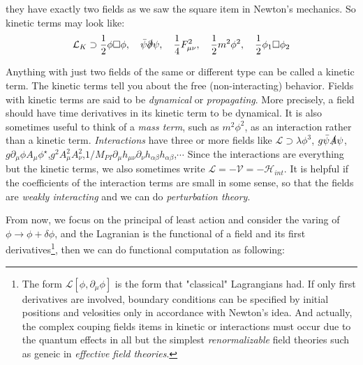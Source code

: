 \documentclass[12pt,openany]{book}
\begin{document}
	they have exactly two fields as we saw the square item in Newton's mechanics. So kinetic terms may look like:
	\begin{equation*}
		\mathcal{L}_K\supset\frac{1}{2}\phi\Box\phi,\quad \bar{\psi}\slashed{\partial}\psi,\quad\frac{1}{4}F^2_{\mu\nu},\quad \frac{1}{2}m^2\phi^2,\quad\frac{1}{2}\phi_1 \Box \phi_2
	\end{equation*}\par 
	Anything with just two fields of the same or different type can be called a kinetic term.
	The kinetic terms tell you about the free (non-interacting) behavior. Fields with kinetic terms are 
	said to be \textit{dynamical} or \textit{propagating}. More precisely, a field should have time derivatives
	in its kinetic term to be dynamical. It is also sometimes useful to think of a \textit{mass term}, such as $m^2\phi^2$,
	as an interaction rather than a kinetic term. \textit{Interactions} have three or more fields like $\mathcal{L}\supset\lambda\phi^3$,
	$g\bar{\psi}\slashed{A}\psi$,$g\partial_\mu\phi A_\mu\phi^\star$,$g^2A_\mu^2A_\nu^2$,$1/M_{PI}\partial_\mu h_{\mu\nu}\partial_\nu h_{\alpha\beta}h_{\alpha\beta}$,$\cdots$ Since
	the interactions are everything but the kinetic terms, we also sometimes write $\mathcal{L}=-\mathcal{V}=-\mathcal{H}_{int}$. It is 
	helpful if the coefficients of the interaction terms are small in some sense, so that the fields are \textit{weakly interacting} and 
	we can do \textit{perturbation theory}.\par
	From now, we focus on the principal of least action and consider the varing
	of $\phi\rightarrow\phi+\delta\phi$, and the Lagranian is the functional of a field and its first derivatives\footnote{
		The form $\mathcal{L}[\phi,\partial_\mu\phi]$ is the form that "classical" Lagrangians had. If only first derivatives are 
		involved, boundary conditions can be specified by initial positions and velosities only in accordance with Newton's idea. And 
		actually, the complex couping fields items in kinetic or interactions must occur due to the quantum effects in all but the simplest
		\textit{renormalizable} field theories such as geneic in \textit{effective field theories}.
	}, then we can do 
	functional computation as following:
\end{document}
